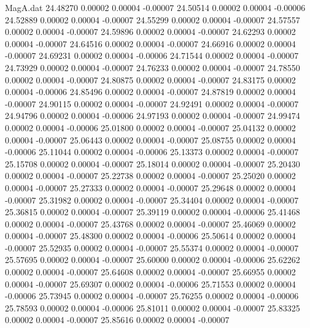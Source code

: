 \begin{filecontents}{MagA.dat}
  24.48270    0.00002    0.00004   -0.00007
  24.50514    0.00002    0.00004   -0.00006
  24.52889    0.00002    0.00004   -0.00007
  24.55299    0.00002    0.00004   -0.00007
  24.57557    0.00002    0.00004   -0.00007
  24.59896    0.00002    0.00004   -0.00007
  24.62293    0.00002    0.00004   -0.00007
  24.64516    0.00002    0.00004   -0.00007
  24.66916    0.00002    0.00004   -0.00007
  24.69231    0.00002    0.00004   -0.00006
  24.71544    0.00002    0.00004   -0.00007
  24.73929    0.00002    0.00004   -0.00007
  24.76233    0.00002    0.00004   -0.00007
  24.78550    0.00002    0.00004   -0.00007
  24.80875    0.00002    0.00004   -0.00007
  24.83175    0.00002    0.00004   -0.00006
  24.85496    0.00002    0.00004   -0.00007
  24.87819    0.00002    0.00004   -0.00007
  24.90115    0.00002    0.00004   -0.00007
  24.92491    0.00002    0.00004   -0.00007
  24.94796    0.00002    0.00004   -0.00006
  24.97193    0.00002    0.00004   -0.00007
  24.99474    0.00002    0.00004   -0.00006
  25.01800    0.00002    0.00004   -0.00007
  25.04132    0.00002    0.00004   -0.00007
  25.06443    0.00002    0.00004   -0.00007
  25.08755    0.00002    0.00004   -0.00006
  25.11044    0.00002    0.00004   -0.00006
  25.13373    0.00002    0.00004   -0.00007
  25.15708    0.00002    0.00004   -0.00007
  25.18014    0.00002    0.00004   -0.00007
  25.20430    0.00002    0.00004   -0.00007
  25.22738    0.00002    0.00004   -0.00007
  25.25020    0.00002    0.00004   -0.00007
  25.27333    0.00002    0.00004   -0.00007
  25.29648    0.00002    0.00004   -0.00007
  25.31982    0.00002    0.00004   -0.00007
  25.34404    0.00002    0.00004   -0.00007
  25.36815    0.00002    0.00004   -0.00007
  25.39119    0.00002    0.00004   -0.00006
  25.41468    0.00002    0.00004   -0.00007
  25.43768    0.00002    0.00004   -0.00007
  25.46069    0.00002    0.00004   -0.00007
  25.48300    0.00002    0.00004   -0.00006
  25.50614    0.00002    0.00004   -0.00007
  25.52935    0.00002    0.00004   -0.00007
  25.55374    0.00002    0.00004   -0.00007
  25.57695    0.00002    0.00004   -0.00007
  25.60000    0.00002    0.00004   -0.00006
  25.62262    0.00002    0.00004   -0.00007
  25.64608    0.00002    0.00004   -0.00007
  25.66955    0.00002    0.00004   -0.00007
  25.69307    0.00002    0.00004   -0.00006
  25.71553    0.00002    0.00004   -0.00006
  25.73945    0.00002    0.00004   -0.00007
  25.76255    0.00002    0.00004   -0.00006
  25.78593    0.00002    0.00004   -0.00006
  25.81011    0.00002    0.00004   -0.00007
  25.83325    0.00002    0.00004   -0.00007
  25.85616    0.00002    0.00004   -0.00007

\end{filecontents}
